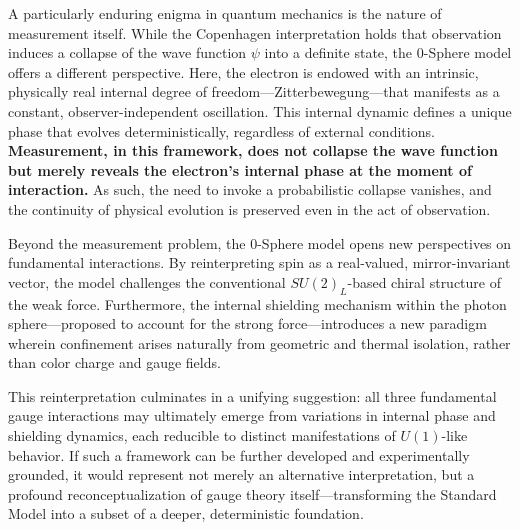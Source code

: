 \documentclass[12pt,letterpaper]{article} %
\begin{document}
A particularly enduring enigma in quantum mechanics is the nature of measurement itself. While the Copenhagen interpretation holds that observation induces a collapse of the wave function $\psi$ into a definite state, the 0-Sphere model offers a different perspective. Here, the electron is endowed with an intrinsic, physically real internal degree of freedom—Zitterbewegung—that manifests as a constant, observer-independent oscillation. This internal dynamic defines a unique phase that evolves deterministically, regardless of external conditions. \textbf{Measurement, in this framework, does not collapse the wave function but merely reveals the electron’s internal phase at the moment of interaction.} As such, the need to invoke a probabilistic collapse vanishes, and the continuity of physical evolution is preserved even in the act of observation.

\medskip

\noindent Beyond the measurement problem, the 0-Sphere model opens new perspectives on fundamental interactions. By reinterpreting spin as a real-valued, mirror-invariant vector, the model challenges the conventional $SU(2)_L$-based chiral structure of the weak force. Furthermore, the internal shielding mechanism within the photon sphere—proposed to account for the strong force—introduces a new paradigm wherein confinement arises naturally from geometric and thermal isolation, rather than color charge and gauge fields.

This reinterpretation culminates in a unifying suggestion: all three fundamental gauge interactions may ultimately emerge from variations in internal phase and shielding dynamics, each reducible to distinct manifestations of $U(1)$-like behavior. If such a framework can be further developed and experimentally grounded, it would represent not merely an alternative interpretation, but a profound reconceptualization of gauge theory itself—transforming the Standard Model into a subset of a deeper, deterministic foundation.
\end{document}
